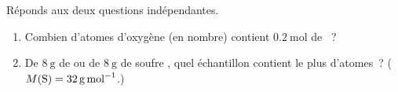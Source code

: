 \documentclass[11pt,a4paper]{article}
\begin{document}
\begin{exo}
Réponds aux deux questions indépendantes.
\begin{enumerate}[label=\alph*)]
  \item Combien d'atomes d'oxygène (en nombre) contient $\SI{0.2}{\mole}$ de ~?
  \item De $\SI{8}{\gram}$ de  ou de $\SI{8}{\gram}$ de soufre , quel échantillon
        contient le plus d'atomes~? ($M(\ce{S})=\SI{32}{\gram\per\mole}$.)
\end{enumerate}
\end{exo}
\end{document}
